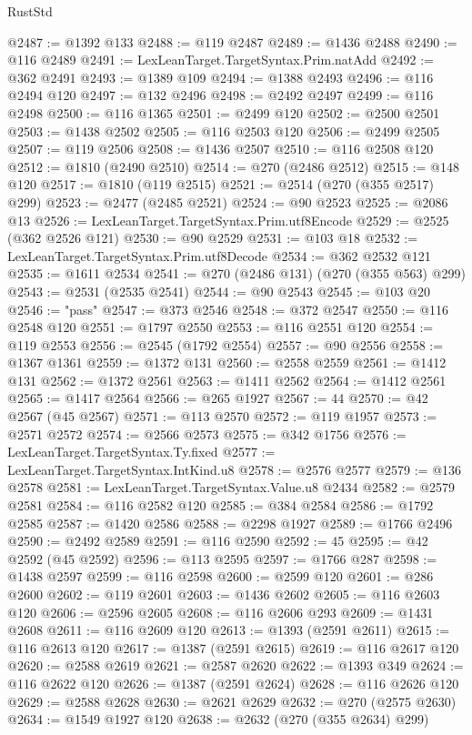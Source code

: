 \begin{lexlean}{RustStd}
\begin{coremodule}
@2487 := @1392 @133
@2488 := @119 @2487
@2489 := @1436 @2488
@2490 := @116 @2489
@2491 := LexLeanTarget.TargetSyntax.Prim.natAdd
@2492 := @362 @2491
@2493 := @1389 @109
@2494 := @1388 @2493
@2496 := @116 @2494 @120
@2497 := @132 @2496
@2498 := @2492 @2497
@2499 := @116 @2498
@2500 := @116 @1365
@2501 := @2499 @120
@2502 := @2500 @2501
@2503 := @1438 @2502
@2505 := @116 @2503 @120
@2506 := @2499 @2505
@2507 := @119 @2506
@2508 := @1436 @2507
@2510 := @116 @2508 @120
@2512 := @1810 (@2490 @2510)
@2514 := @270 (@2486 @2512)
@2515 := @148 @120
@2517 := @1810 (@119 @2515)
@2521 := @2514 (@270 (@355 @2517) @299)
@2523 := @2477 (@2485 @2521)
@2524 := @90 @2523
@2525 := @2086 @13
@2526 := LexLeanTarget.TargetSyntax.Prim.utf8Encode
@2529 := @2525 (@362 @2526 @121)
@2530 := @90 @2529
@2531 := @103 @18
@2532 := LexLeanTarget.TargetSyntax.Prim.utf8Decode
@2534 := @362 @2532 @121
@2535 := @1611 @2534
@2541 := @270 (@2486 @131) (@270 (@355 @563) @299)
@2543 := @2531 (@2535 @2541)
@2544 := @90 @2543
@2545 := @103 @20
@2546 := "pass"
@2547 := @373 @2546
@2548 := @372 @2547
@2550 := @116 @2548 @120
@2551 := @1797 @2550
@2553 := @116 @2551 @120
@2554 := @119 @2553
@2556 := @2545 (@1792 @2554)
@2557 := @90 @2556
@2558 := @1367 @1361
@2559 := @1372 @131
@2560 := @2558 @2559
@2561 := @1412 @131
@2562 := @1372 @2561
@2563 := @1411 @2562
@2564 := @1412 @2561
@2565 := @1417 @2564
@2566 := @265 @1927
@2567 := 44
@2570 := @42 @2567 (@45 @2567)
@2571 := @113 @2570
@2572 := @119 @1957
@2573 := @2571 @2572
@2574 := @2566 @2573
@2575 := @342 @1756
@2576 := LexLeanTarget.TargetSyntax.Ty.fixed
@2577 := LexLeanTarget.TargetSyntax.IntKind.u8
@2578 := @2576 @2577
@2579 := @136 @2578
@2581 := LexLeanTarget.TargetSyntax.Value.u8 @2434
@2582 := @2579 @2581
@2584 := @116 @2582 @120
@2585 := @384 @2584
@2586 := @1792 @2585
@2587 := @1420 @2586
@2588 := @2298 @1927
@2589 := @1766 @2496
@2590 := @2492 @2589
@2591 := @116 @2590
@2592 := 45
@2595 := @42 @2592 (@45 @2592)
@2596 := @113 @2595
@2597 := @1766 @287
@2598 := @1438 @2597
@2599 := @116 @2598
@2600 := @2599 @120
@2601 := @286 @2600
@2602 := @119 @2601
@2603 := @1436 @2602
@2605 := @116 @2603 @120
@2606 := @2596 @2605
@2608 := @116 @2606 @293
@2609 := @1431 @2608
@2611 := @116 @2609 @120
@2613 := @1393 (@2591 @2611)
@2615 := @116 @2613 @120
@2617 := @1387 (@2591 @2615)
@2619 := @116 @2617 @120
@2620 := @2588 @2619
@2621 := @2587 @2620
@2622 := @1393 @349
@2624 := @116 @2622 @120
@2626 := @1387 (@2591 @2624)
@2628 := @116 @2626 @120
@2629 := @2588 @2628
@2630 := @2621 @2629
@2632 := @270 (@2575 @2630)
@2634 := @1549 @1927 @120
@2638 := @2632 (@270 (@355 @2634) @299)

\end{coremodule}
\end{lexlean}
